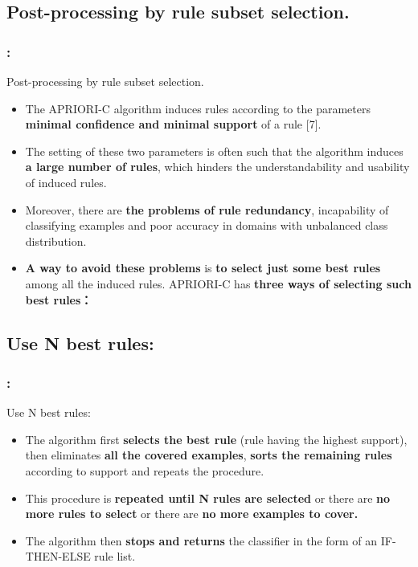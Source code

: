 \documentclass{beamer}
\begin{document}
\begin{CJK*}{UTF8}{bsmi}
\subsection{Post-processing by rule subset selection.}
\begin{frame}
	\frametitle{\insertsection : \insertsubsection}
	\begin{block}{ Post-processing by rule subset selection.}
		\begin{itemize}
			\item  The APRIORI-C algorithm induces rules according to the parameters \textbf{minimal confidence and minimal support} of a rule [7].
			\item The setting of these two parameters is often such that the algorithm induces \textbf{a large number of rules}, which hinders the understandability and usability of induced rules.
			\item Moreover, there are \textbf{the problems of rule redundancy}, incapability of classifying examples and poor accuracy in domains with unbalanced class distribution.
			\item \textbf{A way to avoid these problems} is \textbf{to select just some best rules} among all the induced rules. APRIORI-C has\textbf{ three ways of selecting such best rules：}
		\end{itemize}
	\end{block}
\end{frame}
\subsection{Use N best rules:}
\begin{frame}
	\frametitle{\insertsection : \insertsubsection}
	\begin{block}{ Use N best rules:}
		\begin{itemize}
			\item  The algorithm first \textbf{selects the best rule} (rule having the highest support), then eliminates \textbf{all the covered examples}, \textbf{sorts the remaining rules} according to support and repeats the procedure.
			\item This procedure is\textbf{ repeated until N rules are selected} or there are \textbf{no more rules to select} or there are \textbf{no more examples to cover.}
			\item The algorithm then \textbf{stops and returns} the classifier in the form of an IF-THEN-ELSE rule list.
		\end{itemize}
	\end{block}
\end{frame}

\end{CJK*}
\end{document}
